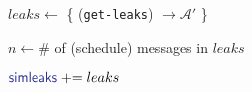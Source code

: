 \newcommand{\simleaks}{{\color{Blue} \msf{simleaks} }}

\begin{bbox}[title={Algorithm $\msf{SimGetLeaks}$}]
	
	\begin{renumerate}
		\item $leaks \leftarrow$ \{ \Send (\texttt{get-leaks}) $\rightarrow \mathcal{\mathcal{A}'}$ \}
		\item $n \leftarrow \#$ of (schedule) messages in $leaks$
		\item $\simleaks \pluseq leaks$
	\end{renumerate}

\end{bbox}

